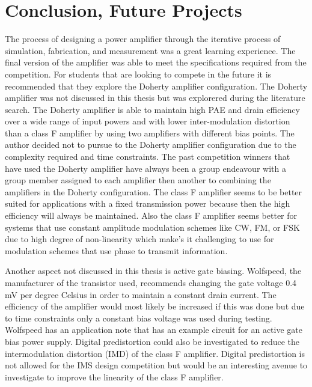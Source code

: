 ﻿\chapter{Conclusion, Future Projects}

The process of designing a power amplifier through the iterative process of simulation, fabrication, and measurement was a great learning experience.  The final version of the amplifier was able to meet the specifications required from the competition. For students that are looking to compete in the future it is recommended that they explore the Doherty amplifier configuration. The Doherty amplifier was not discussed in this thesis but was explorered during the literature search. The Doherty amplifier is able to maintain high PAE and drain efficiency over a wide range of input powers and with lower inter-modulation distortion than a class F amplifier by using two amplifiers with different bias points. The author decided not to pursue to the Doherty amplifier configuration due to the complexity required and time constraints. The past competition winners that have used the Doherty amplifier have always been a group endeavour with a group member assigned to each amplifier then another to combining the amplifiers in the Doherty configuration. The class F amplifier seems to be better suited for applications with a fixed transmission power because then the high efficiency will always be maintained. Also the class F amplifier seems better for systems that use constant amplitude modulation schemes like CW, FM, or FSK due to high degree of non-linearity which make's it challenging to use for modulation schemes that use phase to transmit information.

Another aspect not discussed in this thesis is active gate biasing. Wolfspeed, the manufacturer of the transistor used, recommends changing the gate voltage 0.4 mV per degree Celsius in order to maintain a constant drain current. The efficiency of the amplifier would most likely be increased if this was done but due to time constraints only a constant bias voltage was used during testing. Wolfspeed has an application note that has an example circuit for an active gate bias power supply. Digital predistortion could also be investigated to reduce the intermodulation distortion (IMD) of the class F amplifier. Digital predistortion is not allowed for the IMS design competition but would be an interesting avenue to investigate to improve the linearity of the class F amplifier.
